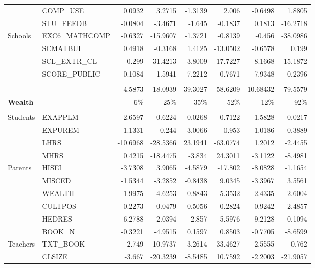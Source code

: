 \documentclass[10pt]{article}
\begin{document}
\begin{table}[htbp]
\begin{tabular}{llrrrrrr}
          & COMP\_USE & 0.0932 & 3.2715 & -1.3139 & 2.006 & -0.6498 & 1.8805 \\[0.4em]
          & STU\_FEEDB & -0.0804 & -3.4671 & -1.645 & -0.1837 & 0.1813 & -16.2718 \\[0.4em]
    Schools & EXC6\_MATHCOMP & -0.6327 & -15.9607 & -1.3721 & -0.8139 & -0.456 & -38.0986 \\[0.4em]
          & SCMATBUI & 0.4918 & -0.3168 & 1.4125 & -13.0502 & -0.6578 & 0.199 \\[0.4em]
          & SCL\_EXTR\_CL & -0.299 & -31.4213 & -3.8009 & -17.7227 & -8.1668 & -15.1872 \\[0.4em]
          & SCORE\_PUBLIC & 0.1084 & -1.5941 & 7.2212 & -0.7671 & 7.9348 & -0.2396 \\[0.4em]
          \cline{3-8} \\
          &       & -4.5873 & 18.0939 & 39.3027 & -58.6209 & 10.68432 & -79.5579 \\[0.4em]
    \textbf{Wealth} &       & -6\%  & 25\%  & 35\%  & -52\% & -12\% & 92\% \\
     \cline{3-8} \\
    Students & EXAPPLM & 2.6597 & -0.6224 & -0.0268 & 0.7122 & 1.5828 & 0.0217 \\[0.4em]
          & EXPUREM & 1.1331 & -0.244 & 3.0066 & 0.953 & 1.0186 & 0.3889 \\[0.4em]
          & LHRS  & -10.6968 & -28.5366 & 23.1941 & -63.0774 & 1.2012 & -2.4455 \\[0.4em]
          & MHRS  & 0.4215 & -18.4475 & -3.834 & 24.3011 & -3.1122 & -8.4981 \\[0.4em]
    Parents & HISEI & -3.7308 & 3.9065 & -4.5879 & -17.802 & -8.0828 & -1.1654 \\[0.4em]
          & MISCED & -1.5344 & -3.2852 & -0.8438 & 9.0345 & -3.3967 & 3.5561 \\[0.4em]
          & WEALTH & 1.9975 & 4.6253 & 0.8843 & 5.3532 & 2.4335 & -2.6004 \\[0.4em]
          & CULTPOS & 0.2273 & -0.0479 & -0.5056 & 0.2824 & 0.9242 & -2.4857 \\[0.4em]
          & HEDRES & -6.2788 & -2.0394 & -2.857 & -5.5976 & -9.2128 & -0.1094 \\[0.4em]
          & BOOK\_N & -0.3221 & -4.9515 & 0.1597 & 0.8503 & -0.7705 & -8.6599 \\[0.4em]
    Teachers & TXT\_BOOK & 2.749 & -10.9737 & 3.2614 & -33.4627 & 2.5555 & -0.762 \\[0.4em]
          & CLSIZE & -3.667 & -20.3239 & -8.5485 & 10.7592 & -2.2003 & -21.9057 \\[0.4em]

\end{tabular}
\end{table}
\end{document}
